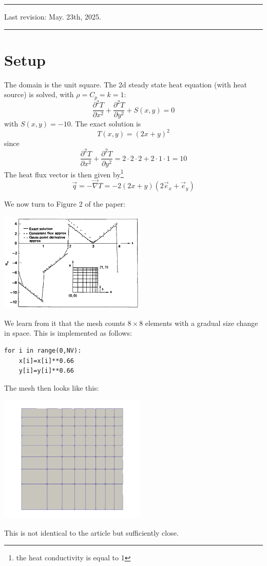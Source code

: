 \par\noindent\rule{\textwidth}{0.4pt}

Last revision: May. 23th, 2025.

\par\noindent\rule{\textwidth}{0.4pt}



\section*{Setup}

The domain is the unit square. 
The 2d steady state heat equation (with heat source) is solved, with $\rho=C_p=k=1$:
\[
\frac{\partial^2 T}{\partial x^2} + \frac{\partial^2 T}{\partial y^2} + S(x,y) = 0
\]
with $S(x,y)=-10$. 
The exact solution is 
\[
T(x,y)=(2x+y)^2
\]
since 
\[
\frac{\partial^2 T}{\partial x^2} + \frac{\partial^2 T}{\partial y^2}
= 2\cdot 2 \cdot 2 + 2 \cdot 1 \cdot 1 = 10
\]
The heat flux vector is then given by\footnote{the heat conductivity is equal to 1}
\[
\vec{q} = - \vec{\nabla} T = -2(2x+y) (2 \vec{e}_x + \vec{e}_y)
\]


We now turn to Figure 2 of the paper:
\begin{center}
\includegraphics[width=7cm]{python_codes/fieldstone_173/images/grls87a}
\end{center}

We learn from it that the mesh counts $8\times 8$ elements with a gradual size change in space.
This is implemented as follows:
\begin{lstlisting}
for i in range(0,NV):
    x[i]=x[i]**0.66
    y[i]=y[i]**0.66
\end{lstlisting}

The mesh then looks like this:

\begin{center}
\includegraphics[width=7cm]{python_codes/fieldstone_173/images/mesh8x8}
\end{center}
This is not identical to the article but sufficiently close.


